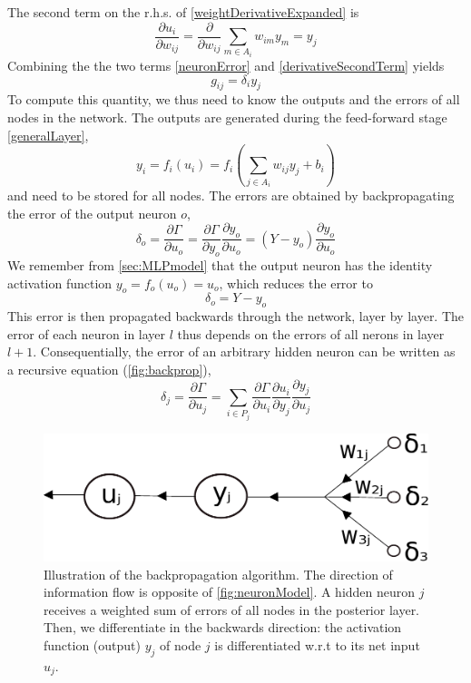 \documentclass[twoside,english]{uiofysmaster}
\begin{document}
\noindent The second term on the r.h.s. of \eqref{weightDerivativeExpanded} is 
\begin{equation}
 \frac{\partial u_i}{\partial w_{ij}} = \frac{\partial}{\partial w_{ij}} \sum_{m\in A_i} w_{im}y_m = y_j
 \label{derivativeSecondTerm}
\end{equation}
Combining the the two terms \eqref{neuronError} and \eqref{derivativeSecondTerm} yields
\begin{equation}
 g_{ij} = \delta_i y_j
 \label{weightGradient}
\end{equation}
To compute this quantity, we thus need to know the outputs and the errors of all nodes in the network. 
The outputs are generated during the feed-forward stage \eqref{generalLayer},
\begin{equation}
 y_i = f_i(u_i) = f_i\left(\sum_{j\in A_i} w_{ij}y_j + b_i\right)
 \label{forwardProp}
\end{equation}
and need to be stored for all nodes. 
The errors are obtained by backpropagating the error of the output neuron $o$,
\begin{equation}
 \delta_o = \frac{\partial \Gamma}{\partial u_o} = \frac{\partial \Gamma}{\partial y_o}\frac{\partial y_o}{\partial u_o}
          = (Y - y_o) \frac{\partial y_o}{\partial u_o}
\end{equation}
We remember from \autoref{sec:MLPmodel} that the output neuron has the identity activation function $y_o = f_o(u_o) = u_o$, 
which reduces the error to
\begin{equation}
 \delta_o = Y  - y_o
\end{equation}
This error is then propagated backwards through the network, layer by layer. 
The error of each neuron in layer $l$ thus depends on the errors of all nerons in layer $l+1$.  
Consequentially, the error of an arbitrary hidden neuron can be written as a recursive equation (\autoref{fig:backprop}),
\begin{equation}
 \delta_j = \frac{\partial \Gamma}{\partial u_j} = 
 \sum_{i\in P_j} \frac{\partial \Gamma}{\partial u_i}\frac{\partial u_i}{\partial y_j}\frac{\partial y_j}{\partial u_j}
 \label{errorTerms}
\end{equation}
\begin{figure}
 \centering
 \includegraphics[width = 0.9\linewidth]{Figures/Theory/backprop.pdf}
  \caption{Illustration of the backpropagation algorithm. The direction of information flow is opposite of \autoref{fig:neuronModel}. 
	   A hidden neuron $j$ receives a weighted sum of errors of all nodes in the posterior layer. Then, we differentiate
	   in the backwards direction: the activation function (output) $y_j$ of node $j$ is differentiated w.r.t to its 
	   net input $u_j$.}
  \label{fig:backprop}
\end{figure}
\end{document}
